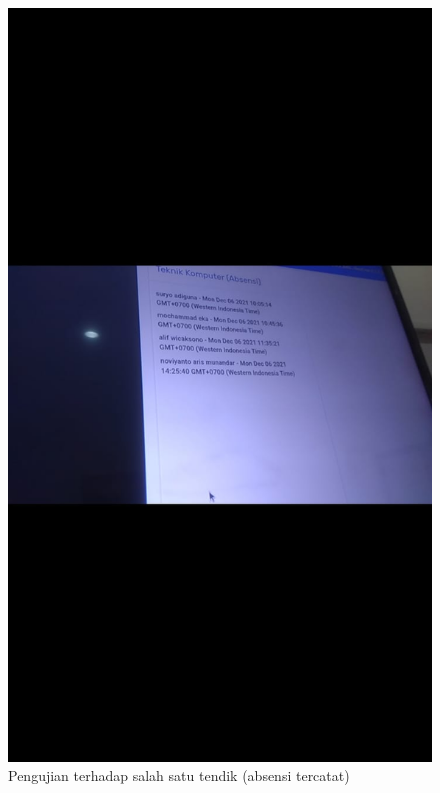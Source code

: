 \begin{figure} [p] \centering
    \includegraphics[scale=0.2]{gambar/masarisdetect.jpeg}
    \caption{Pengujian terhadap salah satu tendik (absensi tercatat)}
    \label{fig:SfMasarisdetect}
\end{figure}

